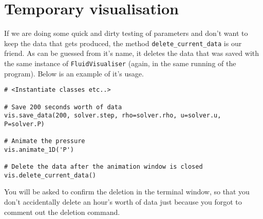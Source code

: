 \documentclass{article}
\newcommand{\ttt}[1]{\texttt{#1}}
\begin{document}
\section{Temporary visualisation}
\label{sec:temp}
If we are doing some quick and dirty testing of parameters and don't want to keep the data that gets produced, the method \ttt{delete\_current\_data} is our friend. As can be guessed from it's name, it deletes the data that was saved with the same instance of \ttt{FluidVisualiser} (again, in the same running of the program). Below is an example of it's usage.\\
\begin{minipage}{\linewidth}
\begin{lstlisting}
# <Instantiate classes etc..>

# Save 200 seconds worth of data
vis.save_data(200, solver.step, rho=solver.rho, u=solver.u, P=solver.P)

# Animate the pressure
vis.animate_1D('P')

# Delete the data after the animation window is closed
vis.delete_current_data()
\end{lstlisting}
\end{minipage}
You will be asked to confirm the deletion in the terminal window, so that you don't accidentally delete an hour's worth of data just because you forgot to comment out the deletion command.
\end{document}
